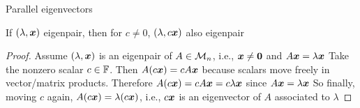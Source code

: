 \documentclass[aspectratio=169]{beamer}\usepackage[]{graphicx}\usepackage[]{xcolor}
\begin{document}
\begin{frame}[red]{Parallel eigenvectors}
\begin{importanttheorem}
If $(\lambda,\bm{x})$ eigenpair, then for $c\neq 0$, $(\lambda,c\bm{x})$ also eigenpair
\end{importanttheorem}
\vfill
\begin{proof}
Assume $(\lambda,\bm{x})$ is an eigenpair of $A\in\mathcal{M}_n$, i.e., $\bx\neq\b0$ and $A\bm{x}=\lambda \bm{x}$
\vskip0.5cm
Take the nonzero scalar $c\in\mathbb{F}$.
Then $A(c\bm{x})=cA\bm{x}$ because scalars move freely in vector/matrix products.
Therefore $A(c\bm{x})=cA\bm{x}=c\lambda\bm{x}$ since $A\bm{x}=\lambda\bm{x}$
\vskip0.5cm
So finally, moving $c$ again, $A(c\bm{x})=\lambda(c\bm{x})$, i.e., $c\bm{x}$ is an eigenvector of $A$ associated to $\lambda$
\end{proof}
\end{frame}






\end{document}
